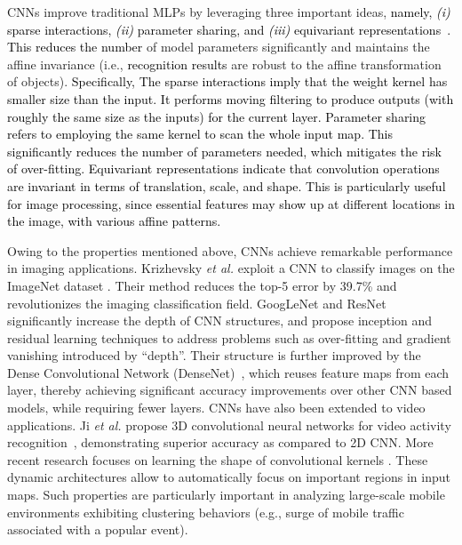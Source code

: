 \documentclass[journal,comsoc,letter]{IEEEtran}
\newcommand{\edit}[1]{\textcolor{black}{#1}}
\newcommand{\rev}[1]{\textcolor{black}{#1}}
\begin{document}
CNNs improve traditional MLPs by leveraging three important ideas, \edit{namely, \emph{(i)} sparse interactions, \emph{(ii)} parameter sharing, and \emph{(iii)} equivariant representations~\cite{goodfellow2016deep}. This reduces the number} of model parameters significantly and maintains the affine invariance (i.e., \rev{recognition results} are robust to the affine transformation of objects). 
\edit{
Specifically, The sparse interactions imply that the weight kernel has smaller size than the input. It performs moving filtering to produce outputs (with roughly the same size as the inputs) for the current layer. Parameter sharing refers to employing the same kernel to scan the whole input map. This significantly reduces the number of parameters needed, which mitigates the risk of over-fitting. Equivariant representations indicate that convolution operations are invariant in terms of translation, scale, and shape. This is particularly useful for image processing, since essential features may show up at different locations in the image, with various affine patterns. }

Owing to the properties mentioned above, CNNs achieve remarkable performance in imaging applications. Krizhevsky \emph{et al.} \cite{krizhevsky2012imagenet} exploit a CNN to classify images on the ImageNet dataset \cite{ILSVRC15}. Their method reduces the top-5 error by 39.7\% and revolutionizes the imaging classification field. GoogLeNet \cite{szegedy2015going} and ResNet \cite{he2016deep} significantly increase the depth of CNN structures, and propose inception and residual learning techniques to address problems such as over-fitting and gradient vanishing introduced by ``depth''. Their structure is further improved by the Dense Convolutional Network (DenseNet)~\cite{huang2017densely}, which reuses feature maps from each layer, thereby achieving significant accuracy improvements over other CNN based models, while requiring fewer layers. CNNs have also been extended to video applications. Ji \emph{et al.} propose 3D convolutional neural networks for video activity recognition~\cite{ji20133d}, demonstrating superior accuracy as compared to 2D CNN. More recent research focuses on learning the shape of convolutional kernels \cite{active2017yunho, dai2017deformable, Zhu2018morel}. These dynamic architectures allow to automatically focus on important regions in input maps. Such properties are particularly important in analyzing large-scale mobile environments exhibiting clustering behaviors (e.g., surge of mobile traffic associated with a popular event). 
\end{document}
